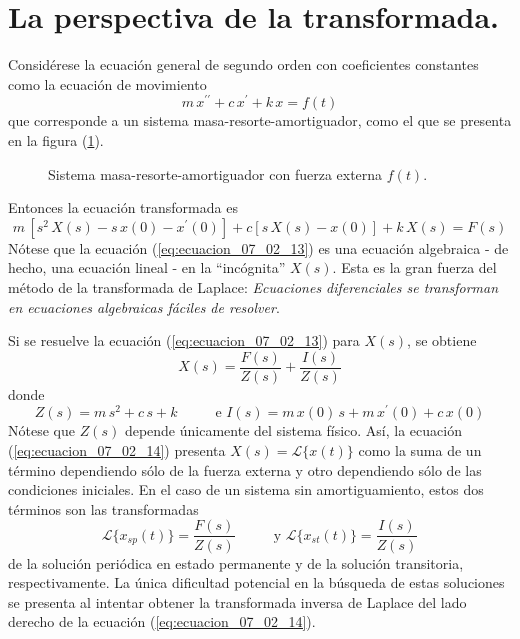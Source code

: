 \section{La perspectiva de la transformada.}
Considérese la ecuación general de segundo orden con coeficientes constantes como la ecuación de movimiento
\[ m \, x^{\prime \prime} + c \, x^{\prime} + k \, x =  f(t) \]
que corresponde a un sistema masa-resorte-amortiguador, como el que se presenta en la figura (\ref{fig:figura_007}).
\begin{figure}[H]
    \centering
    
    \caption{Sistema masa-resorte-amortiguador con fuerza externa $f(t)$.}
    \label{fig:figura_007}
\end{figure}
Entonces la ecuación transformada es
\begin{equation}
m \, [s^{2} \, X(s) - s \, x(0) - x^{\prime}(0) ] + c [ s \, X(s) - x(0) ] + k \, X(s) = F(s)
\label{eq:ecuacion_07_02_13}
\end{equation}
Nótese que la ecuación (\ref{eq:ecuacion_07_02_13}) es una ecuación algebraica  - de hecho, una ecuación lineal - en la \enquote{incógnita} $X(s)$. Esta es la gran fuerza del método de la transformada de Laplace: \emph{Ecuaciones diferenciales se transforman en ecuaciones algebraicas fáciles de resolver}.
\par
Si se resuelve la ecuación (\ref{eq:ecuacion_07_02_13}) para $X(s)$, se obtiene
\begin{equation}
X(s) = \dfrac{F(s)}{Z(s)} + \dfrac{I(s)}{Z(s)}
\label{eq:ecuacion_07_02_14}
\end{equation}
donde
\[ Z(s) = m \, s^{2} + c \, s + k \hspace{1cm} \mbox{ e }  I(s) = m \, x(0) \, s + m \, x^{\prime} (0) + c \, x(0) \]
Nótese que $Z(s)$ depende únicamente del sistema físico. Así, la ecuación (\ref{eq:ecuacion_07_02_14}) presenta $X(s)= \mathscr{L} \{ x(t)\} $ como la suma de un término dependiendo sólo de la fuerza externa y otro dependiendo sólo de las condiciones iniciales. En el caso de un sistema sin amortiguamiento, estos dos términos son las transformadas
\[ \mathscr{L} \{ x_{sp} (t) \} = \dfrac{F(s)}{Z(s)} \hspace{1cm} \mbox{ y } \mathscr{L} \{ x_{st} (t) \} = \dfrac{I(s)}{Z(s)} \]
de la solución periódica en estado permanente y de la solución transitoria, respectivamente. La única dificultad potencial en la búsqueda de estas soluciones se presenta al intentar obtener la transformada inversa de Laplace del lado derecho de la ecuación (\ref{eq:ecuacion_07_02_14}). 
